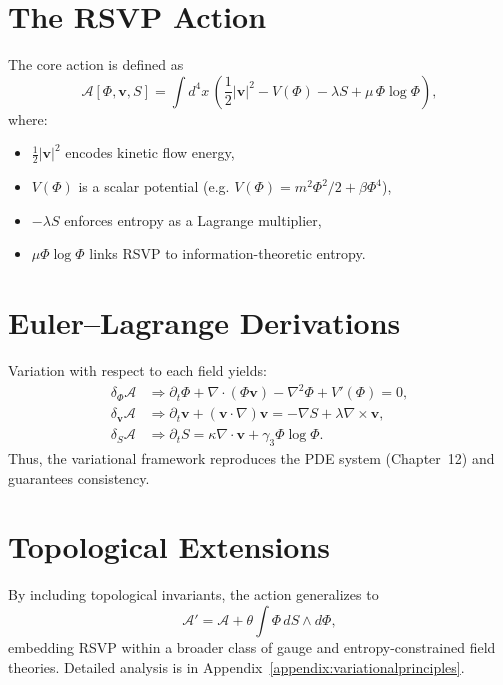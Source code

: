 \documentclass[12pt]{report}
\begin{document}
\section{The RSVP Action}

The core action is defined as
\begin{equation}
\mathcal{A}[\Phi,\mathbf{v},S] = \int d^4x \,
\left( \frac{1}{2} |\mathbf{v}|^2 - V(\Phi) - \lambda S + \mu \, \Phi \log \Phi \right),
\label{eq:action}
\end{equation}
where:
\begin{itemize}
    \item $\frac{1}{2}|\mathbf{v}|^2$ encodes kinetic flow energy,
    \item $V(\Phi)$ is a scalar potential (e.g. $V(\Phi) = m^2\Phi^2/2 + \beta \Phi^4$),
    \item $-\lambda S$ enforces entropy as a Lagrange multiplier,
    \item $\mu \Phi \log \Phi$ links RSVP to information-theoretic entropy.
\end{itemize}

\section{Euler–Lagrange Derivations}

Variation with respect to each field yields:
\begin{align}
\delta_\Phi \mathcal{A} &\Rightarrow \partial_t \Phi + \nabla\cdot(\Phi \mathbf{v}) - \nabla^2 \Phi + V'(\Phi) = 0, \\
\delta_{\mathbf{v}} \mathcal{A} &\Rightarrow \partial_t \mathbf{v} + (\mathbf{v}\cdot\nabla)\mathbf{v} = -\nabla S + \lambda \nabla \times \mathbf{v}, \\
\delta_S \mathcal{A} &\Rightarrow \partial_t S = \kappa \nabla \cdot \mathbf{v} + \gamma_3 \Phi \log \Phi.
\end{align}
Thus, the variational framework reproduces the PDE system (Chapter~12) and guarantees consistency.

\section{Topological Extensions}

By including topological invariants, the action generalizes to
\begin{equation}
\mathcal{A}' = \mathcal{A} + \theta \int \Phi \, dS \wedge d\Phi,
\end{equation}
embedding RSVP within a broader class of gauge and entropy-constrained field theories.  
Detailed analysis is in Appendix~\ref{appendix:variationalprinciples}.
\end{document}

